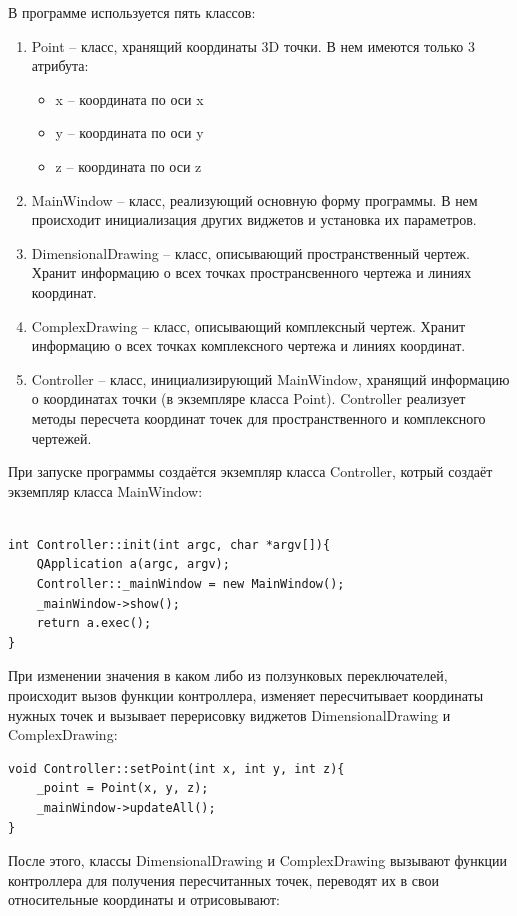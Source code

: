 \documentclass[13pt]{extarticle}
\begin{document}
В программе используется пять классов:
\begin{enumerate}
	\item Point -- класс, хранящий координаты 3D точки. В нем имеются только 3 атрибута:
		\begin{itemize}
			\item x -- координата по оси x
			\item y -- координата по оси y
			\item z -- координата по оси z
		\end{itemize}
	\item MainWindow --  класс, реализующий основную форму программы. В нем происходит инициализация других виджетов и установка их параметров.
	\item DimensionalDrawing -- класс, описывающий пространственный чертеж. Хранит информацию о всех точках пространсвенного чертежа и линиях координат.
	\item ComplexDrawing -- класс, описывающий комплексный чертеж. Хранит информацию о всех точках комплексного чертежа и линиях координат. 
	\item Controller -- класс, инициализирующий MainWindow, хранящий информацию о координатах точки (в экземпляре класса Point). Controller реализует методы пересчета координат точек для пространственного и комплексного чертежей.
\end{enumerate}

При запуске программы создаётся экземпляр класса Controller, котрый создаёт экземпляр класса MainWindow:
\begin{lstlisting}

int Controller::init(int argc, char *argv[]){
    QApplication a(argc, argv);
    Controller::_mainWindow = new MainWindow();
    _mainWindow->show();
    return a.exec();
}
\end{lstlisting}

При изменении значения в каком либо из ползунковых переключателей, происходит вызов функции контроллера, изменяет пересчитывает координаты нужных точек и вызывает перерисовку виджетов DimensionalDrawing и ComplexDrawing:
\begin{lstlisting}
void Controller::setPoint(int x, int y, int z){
    _point = Point(x, y, z);
    _mainWindow->updateAll();
}
\end{lstlisting}
После этого, классы DimensionalDrawing и ComplexDrawing вызывают функции контроллера для получения пересчитанных точек, переводят их в свои относительные координаты и отрисовывают:
\end{document}
